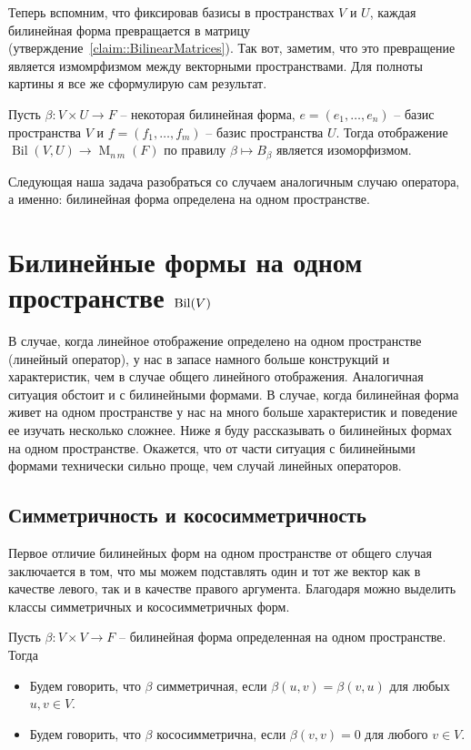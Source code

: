 Теперь вспомним, что фиксировав базисы в пространствах $V$ и $U$, каждая билинейная форма превращается в матрицу (утверждение~\ref{claim::BilinearMatrices}).
Так вот, заметим, что это превращение является измомрфизмом между векторными пространствами.
Для полноты картины я все же сформулирую сам результат.

\begin{claim}
Пусть $\beta\colon V\times U\to F$ -- некоторая билинейная форма,  $e = (e_1,\ldots,e_n)$ -- базис пространства $V$ и $f=(f_1,\ldots,f_m)$ -- базис пространства $U$.
Тогда отображение $\operatorname{Bil}(V,U)\to \operatorname{M}_{n\,m}(F)$ по правилу $\beta\mapsto B_\beta$ является изоморфизмом.
\end{claim}

Следующая наша задача разобраться со случаем аналогичным случаю оператора, а именно: билинейная форма определена на одном пространстве.


\newpage
\section{Билинейные формы на одном пространстве $\operatorname{Bil}(V)$}

В случае, когда линейное отображение определено на одном пространстве (линейный оператор), у нас в запасе намного больше конструкций и характеристик, чем в случае общего линейного отображения.
Аналогичная ситуация обстоит и с билинейными формами.
В случае, когда билинейная форма живет на одном пространстве у нас на много больше характеристик и поведение ее изучать несколько сложнее.
Ниже я буду рассказывать о билинейных формах на одном пространстве.
Окажется, что от части ситуация с билинейными формами технически сильно проще, чем случай линейных операторов.

\subsection{Симметричность и кососимметричность}

Первое отличие билинейных форм на одном пространстве от общего случая заключается в том, что мы можем подставлять один и тот же вектор как в качестве левого, так и в качестве правого аргумента.
Благодаря можно выделить классы симметричных и кососимметричных форм.

\begin{definition}
Пусть $\beta\colon V\times V\to F$ -- билинейная форма определенная на одном пространстве.
Тогда
\begin{itemize}
\item Будем говорить, что $\beta$ симметричная, если $\beta(u,v) = \beta(v,u)$ для любых $u,v\in V$.

\item Будем говорить, что $\beta$ кососимметрична, если $\beta(v,v) = 0$ для любого $v\in V$.
\end{itemize}
\end{definition}

